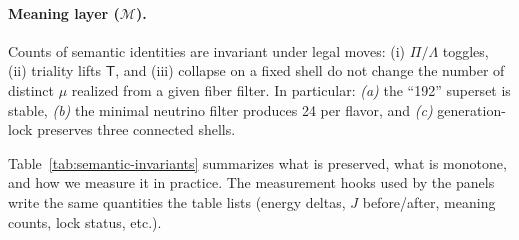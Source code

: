 \paragraph{Meaning layer (\(\mathcal M\)).}
Counts of semantic identities are invariant under legal moves:
(i) \(\Pi/\Lambda\) toggles, (ii) triality lifts \(\mathsf T\), and (iii) collapse
on a fixed shell do not change the number of distinct \(\mu\) realized from a
given fiber filter. In particular: \emph{(a)} the “192” superset is stable,
\emph{(b)} the minimal neutrino filter produces 24 per flavor, and
\emph{(c)} generation-lock preserves three connected shells.

\medskip
Table~\ref{tab:semantic-invariants} summarizes what is preserved, what is
monotone, and how we measure it in practice. The measurement hooks used by the
panels write the same quantities the table lists (energy deltas, \(J\) before/after,
meaning counts, lock status, etc.).


